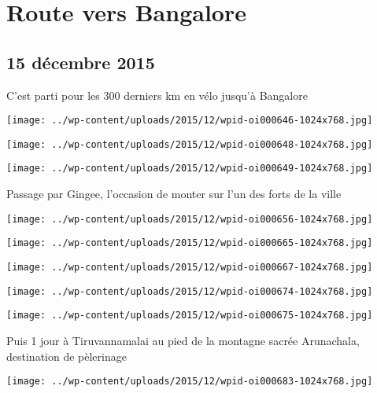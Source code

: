 \chapter{Route vers Bangalore}
\section*{15 décembre 2015}
C'est parti pour les 300 derniers km en vélo jusqu'à Bangalore \newline
 \newline
\centerline{\texttt{[image: ../wp-content/uploads/2015/12/wpid-oi000646-1024x768.jpg]} } 
 \newline
 \newline
\centerline{\texttt{[image: ../wp-content/uploads/2015/12/wpid-oi000648-1024x768.jpg]} } 
 \newline
 \newline
\centerline{\texttt{[image: ../wp-content/uploads/2015/12/wpid-oi000649-1024x768.jpg]} } 
 \newline
 Passage par Gingee, l'occasion de monter sur l'un des forts de la ville \newline
 \newline
\centerline{\texttt{[image: ../wp-content/uploads/2015/12/wpid-oi000656-1024x768.jpg]} } 
 \newline
 \newline
\centerline{\texttt{[image: ../wp-content/uploads/2015/12/wpid-oi000665-1024x768.jpg]} } 
 \newline
 \newline
\centerline{\texttt{[image: ../wp-content/uploads/2015/12/wpid-oi000667-1024x768.jpg]} } 
 \newline
 \newline
\centerline{\texttt{[image: ../wp-content/uploads/2015/12/wpid-oi000674-1024x768.jpg]} } 
 \newline
 \newline
\centerline{\texttt{[image: ../wp-content/uploads/2015/12/wpid-oi000675-1024x768.jpg]} } 
 \newline
 Puis 1 jour à Tiruvannamalai au pied de la montagne sacrée Arunachala, destination de pèlerinage \newline
 \newline
\centerline{\texttt{[image: ../wp-content/uploads/2015/12/wpid-oi000683-1024x768.jpg]} } 
 \newline
